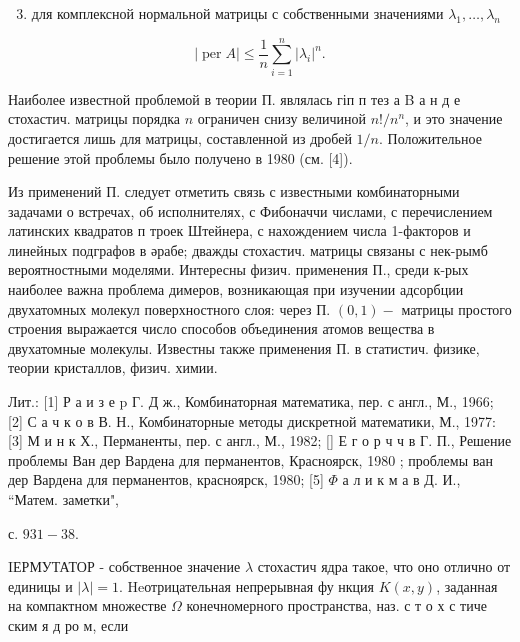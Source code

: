 \documentclass[10pt]{article}
\begin{document}
\begin{enumerate}

  \setcounter{enumi}{2}

  \item для комплексной нормальной матрицы с собственными значениями $\lambda_{1}, \ldots, \lambda_{n}$

\end{enumerate}



\[

|\operatorname{per} A| \leqslant \frac{1}{n} \sum_{i=1}^{n}\left|\lambda_{i}\right|^{n} .

\]



Наиболее известной проблемой в теории П. являлась гіп п тез а B а н д е стохастич. матрицы порядка $n$ ограничен снизу величиной $n ! / n^{n}$, и это значение достигается лишь для матрицы, составленной из дробей $1 / n$. Положительное решение этой проблемы было получено в 1980 (см. [4]).



Из применений П. следует отметить связь с известными комбинаторными задачами о встречах, об исполнителях, с Фибоначчи числами, с перечислением латинских квадратов п троек Штейнера, с нахождением числа 1-факторов и линейных подграфов в әрабе; дважды стохастич. матрицы связаны с нек-рымб вероятностными моделями. Интересны физич. применения П., среди к-рых наиболее важна проблема димеров, возникающая при изучении адсорбции двухатомных молекул поверхностного слоя: через П. $(0,1)-$ матрицы простого строения выражается число способов объединения атомов вещества в двухатомные молекулы. Известны также применения П. в статистич. физике, теории кристаллов, физич. химии.



Лит.: [1] Р а и з е p Г. Д ж., Комбинаторная математика, пер. с англ., М., 1966; [2] С а ч к о в В. Н., Комбинаторные методы дискретной математики, М., 1977: [3] М и н к Х., Перманенты, пер. с англ., М., 1982; [ُ] Е г о р ч ч в Г. П., Решение проблемы Ван дер Вардена для перманентов, Красноярск, 1980 ; проблемы ван дер Вардена для перманентов, красноярск, 1980; [5] $\Phi$ а л и к м а в Д. И., “Матем. заметки",

с. $931-38$.



IЕРМУТАТОР - собственное значение $\lambda$ стохастич ядра такое, что оно отлично от единицы и $|\lambda|=1$. Heотрицательная непрерывная фу нкция $K(x, y)$, заданная на компактном множестве $\Omega$ конечномерного пространства, наз. с т о х с тиче ским я д ро м, если
\end{document}
